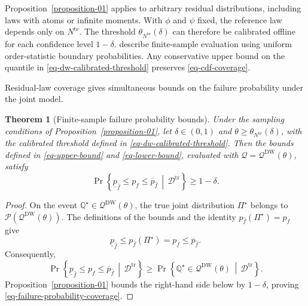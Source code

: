 \documentclass[review,11pt,3p,authoryear,nopreprintline]{elsarticle}
\newtheorem{theorem}{Theorem}
\begin{document}
Proposition~\ref{proposition-01} applies to arbitrary residual distributions, including laws with atoms or infinite moments. With $\phi$ and $\psi$ fixed, the reference law depends only on $N^{\mathrm{te}}$. The threshold $\theta_{N^{\mathrm{te}}}(\delta)$ can therefore be calibrated offline for each confidence level $1-\delta$. \citet{L.J23} describe finite-sample evaluation using uniform order-statistic boundary probabilities. Any conservative upper bound on the quantile in \eqref{eq-dw-calibrated-threshold} preserves \eqref{eq-cdf-coverage}.

Residual-law coverage gives simultaneous bounds on the failure probability under the joint model.

\begin{theorem}[Finite-sample failure probability bounds]
  \label{theorem-01}
  Under the sampling conditions of Proposition~\ref{proposition-01}, let $\delta\in(0,1)$ and $\theta\ge\theta_{N^{\mathrm{te}}}(\delta)$, with the calibrated threshold defined in \eqref{eq-dw-calibrated-threshold}. Then the bounds defined in \eqref{eq-upper-bound} and \eqref{eq-lower-bound}, evaluated with $\mathcal Q=\mathcal Q^{\mathrm{DW}}(\theta)$, satisfy
  \begin{equation}
    \Pr\left\{\underline p_{\hat f}\le p_f\le\overline p_{\hat f}\,\middle|\,\mathcal D^{\mathrm{tr}}\right\}\ge1-\delta.
    \label{eq-failure-probability-coverage}
  \end{equation}
\end{theorem}

\begin{proof}
  On the event $\mathbb Q^\star\in\mathcal Q^{\mathrm{DW}}(\theta)$, the true joint distribution $\Pi^\star$ belongs to $\mathcal P\left(\mathcal Q^{\mathrm{DW}}(\theta)\right)$. The definitions of the bounds and the identity $p_{\hat f}(\Pi^\star)=p_f$ give
  \[
    \underline p_{\hat f}
    \le p_{\hat f}(\Pi^\star)
    =p_f
    \le\overline p_{\hat f}.
  \]
  Consequently,
  \[
    \Pr\left\{
      \underline p_{\hat f}\le p_f\le\overline p_{\hat f}
      \,\middle|\,\mathcal D^{\mathrm{tr}}
    \right\}
    \ge
    \Pr\left\{
      \mathbb Q^\star\in\mathcal Q^{\mathrm{DW}}(\theta)
      \,\middle|\,\mathcal D^{\mathrm{tr}}
    \right\}.
  \]
  Proposition~\ref{proposition-01} bounds the right-hand side below by $1-\delta$, proving \eqref{eq-failure-probability-coverage}.
\end{proof}
\end{document}
